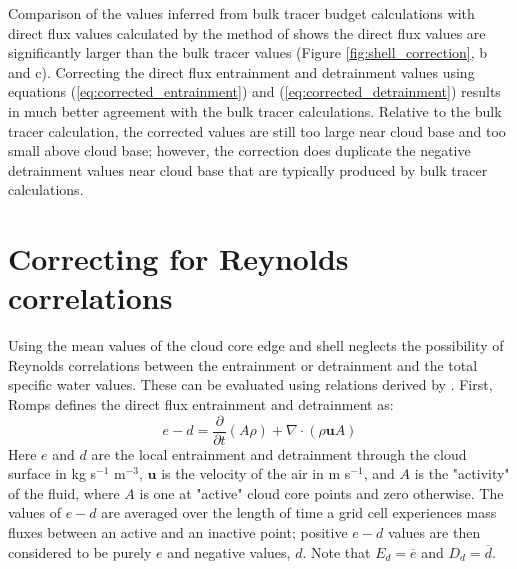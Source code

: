 \documentclass[draft,grl]{agutex}
\begin{document}
\begin{article}
Comparison of the values inferred from bulk tracer budget calculations with 
direct flux values calculated by the method of \cite{Romps2010} shows the 
direct flux values are significantly larger than the bulk tracer values 
(Figure \ref{fig:shell_correction}, b and c).  Correcting the direct flux 
entrainment and detrainment values using equations 
(\ref{eq:corrected_entrainment}) and (\ref{eq:corrected_detrainment}) results 
in much better agreement with the bulk tracer calculations.  Relative to the 
bulk tracer calculation, the corrected values are still too large near cloud 
base and too small above cloud base; however, the correction does duplicate the 
negative detrainment values near cloud base that are typically produced by bulk 
tracer calculations.


\section{Correcting for Reynolds correlations}

Using the mean values of the cloud core edge and shell neglects the possibility 
of Reynolds correlations between the entrainment or detrainment and the total 
specific water values.  These can be evaluated using relations derived by 
\cite{Romps2010}.  First, Romps defines the direct flux entrainment and 
detrainment as:
\begin{equation}
  \label{eq:romps_e_minus_d}
  e - d = \frac{\partial}{\partial t}(A\rho) 
        + \nabla \cdot (\rho \mathbf{u} A) 
\end{equation}
Here $e$ and $d$ are the local entrainment and detrainment through the cloud 
surface in kg s$^{-1}$ m$^{-3}$, $\mathbf{u}$ is the velocity of the air in 
m s$^{-1}$, and $A$ is the "activity" of the fluid, where $A$ is one at "active" 
cloud core points and zero otherwise.  The values of $e - d$ are averaged 
over the length of time a grid cell experiences mass fluxes between an active 
and an inactive point; positive $e-d$ values are then considered to be purely 
$e$ and negative values, $d$.  Note that $E_d = \overline{e}$ and 
$D_d = \overline{d}$.


\end{article}
\end{document}
